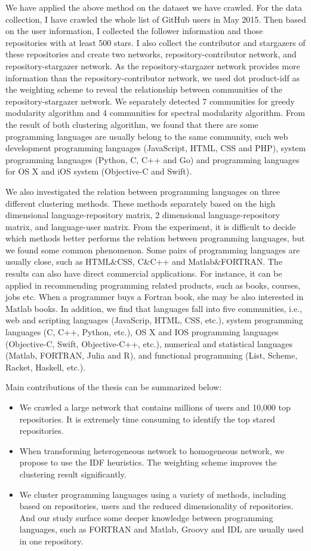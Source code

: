 \documentclass[12pt,oneside,final]{vlsithesis}
\begin{document}
We have applied the above method on the dataset we have crawled. For the data collection, I have crawled the whole list of GitHub users in May 2015. Then based on the user information, I collected the follower information and those repositories with at least 500 stars.  I also collect the contributor and stargazers of these repositories and create two networks, repository-contributor network, and repository-stargazer network. As the repository-stargazer network provides more information than the repository-contributor network, we used dot product-idf as the weighting scheme to reveal the relationship between communities of the repository-stargazer network. We separately detected 7 communities for greedy modularity algorithm and 4 communities for spectral modularity algorithm. From the result of both clustering algorithm, we found that there are some programming languages are usually belong to the same community, such web development programming languages (JavaScript, HTML, CSS and PHP), system programming languages (Python, C, C++ and Go) and programming languages for OS X and iOS system (Objective-C and Swift). 

We also investigated the relation between programming languages on three different clustering methods. These methods separately based on the high dimensional language-repository matrix, 2 dimensional language-repository matrix, and language-user matrix. From the experiment, it is difficult to decide which methods better performs the relation between programming languages, but we found some common phenomenon. Some pairs of programming languages are usually close, such as HTML\&CSS, C\&C++ and Matlab\&FORTRAN. The results can also have direct commercial applications. For instance, it can be applied in recommending programming related products, such as books, courses, jobs etc. When a programmer buys a Fortran book, she may be also interested in Matlab books. In addition, we find that languages fall into five communities, i.e., web and  scripting languages (JavaScrip, HTML, CSS, etc.), system programming languages (C, C++, Python, etc.), OS X and IOS programming languages (Objective-C, Swift, Objective-C++, etc.), numerical and statistical languages (Matlab, FORTRAN, Julia and R), and functional programming (List, Scheme, Racket, Haskell, etc.). 

Main contributions of the thesis can be summarized below: 
\begin{itemize}
\item We crawled a large network that contains millions of users and 10,000 top repositories. It is extremely time consuming to identify the top stared repositories. 
\item When transforming heterogeneous network to homogeneous network, we propose to use the IDF heuristics. The weighting scheme improves the clustering result significantly. 
\item We cluster programming languages using a variety of methods, including based on repositories, users and the reduced dimensionality of repositories. And our study surface some deeper knowledge between programming languages, such as FORTRAN and Matlab, Groovy and IDL are usually used in one repository. 
\end{itemize}
\end{document}
